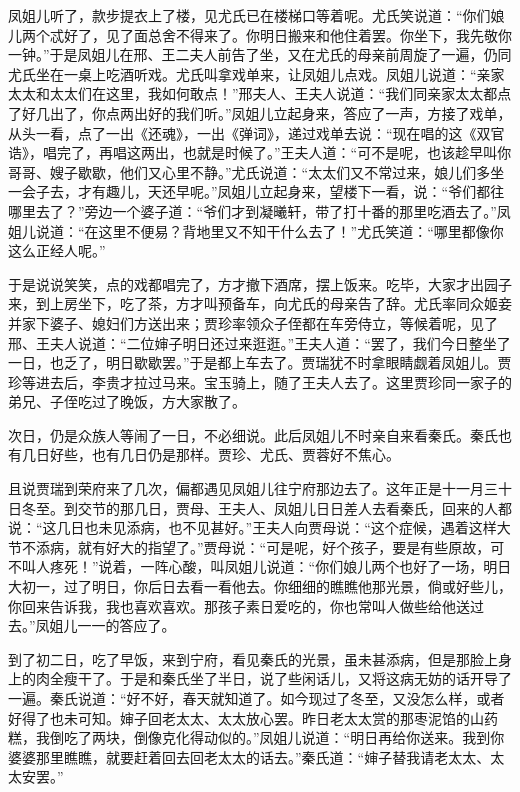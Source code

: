 \documentclass[12pt,oneside]{book}
\begin{document}
凤姐儿听了，款步提衣上了楼，见尤氏已在楼梯口等着呢。尤氏笑说道：“你们娘儿两个忒好了，见了面总舍不得来了。你明日搬来和他住着罢。你坐下，我先敬你一钟。”于是凤姐儿在邢、王二夫人前告了坐，又在尤氏的母亲前周旋了一遍，仍同尤氏坐在一桌上吃酒听戏。尤氏叫拿戏单来，让凤姐儿点戏。凤姐儿说道：“亲家太太和太太们在这里，我如何敢点！”邢夫人、王夫人说道：“我们同亲家太太都点了好几出了，你点两出好的我们听。”凤姐儿立起身来，答应了一声，方接了戏单，从头一看，点了一出《还魂》，一出《弹词》，递过戏单去说：“现在唱的这《双官诰》，唱完了，再唱这两出，也就是时候了。”王夫人道：“可不是呢，也该趁早叫你哥哥、嫂子歇歇，他们又心里不静。”尤氏说道：“太太们又不常过来，娘儿们多坐一会子去，才有趣儿，天还早呢。”凤姐儿立起身来，望楼下一看，说：“爷们都往哪里去了？”旁边一个婆子道：“爷们才到凝曦轩，带了打十番的那里吃酒去了。”凤姐儿说道：“在这里不便易？背地里又不知干什么去了！”尤氏笑道：“哪里都像你这么正经人呢。”

于是说说笑笑，点的戏都唱完了，方才撤下酒席，摆上饭来。吃毕，大家才出园子来，到上房坐下，吃了茶，方才叫预备车，向尤氏的母亲告了辞。尤氏率同众姬妾并家下婆子、媳妇们方送出来；贾珍率领众子侄都在车旁侍立，等候着呢，见了邢、王夫人说道：“二位婶子明日还过来逛逛。”王夫人道：“罢了，我们今日整坐了一日，也乏了，明日歇歇罢。”于是都上车去了。贾瑞犹不时拿眼睛觑着凤姐儿。贾珍等进去后，李贵才拉过马来。宝玉骑上，随了王夫人去了。这里贾珍同一家子的弟兄、子侄吃过了晚饭，方大家散了。

次日，仍是众族人等闹了一日，不必细说。此后凤姐儿不时亲自来看秦氏。秦氏也有几日好些，也有几日仍是那样。贾珍、尤氏、贾蓉好不焦心。

且说贾瑞到荣府来了几次，偏都遇见凤姐儿往宁府那边去了。这年正是十一月三十日冬至。到交节的那几日，贾母、王夫人、凤姐儿日日差人去看秦氏，回来的人都说：“这几日也未见添病，也不见甚好。”王夫人向贾母说：“这个症候，遇着这样大节不添病，就有好大的指望了。”贾母说：“可是呢，好个孩子，要是有些原故，可不叫人疼死！”说着，一阵心酸，叫凤姐儿说道：“你们娘儿两个也好了一场，明日大初一，过了明日，你后日去看一看他去。你细细的瞧瞧他那光景，倘或好些儿，你回来告诉我，我也喜欢喜欢。那孩子素日爱吃的，你也常叫人做些给他送过去。”凤姐儿一一的答应了。

到了初二日，吃了早饭，来到宁府，看见秦氏的光景，虽未甚添病，但是那脸上身上的肉全瘦干了。于是和秦氏坐了半日，说了些闲话儿，又将这病无妨的话开导了一遍。秦氏说道：“好不好，春天就知道了。如今现过了冬至，又没怎么样，或者好得了也未可知。婶子回老太太、太太放心罢。昨日老太太赏的那枣泥馅的山药糕，我倒吃了两块，倒像克化得动似的。”凤姐儿说道：“明日再给你送来。我到你婆婆那里瞧瞧，就要赶着回去回老太太的话去。”秦氏道：“婶子替我请老太太、太太安罢。”
\end{document}

